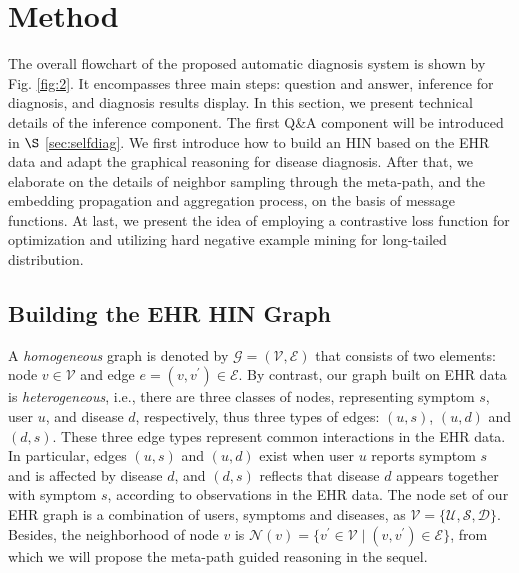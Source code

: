 \documentclass[sigconf]{acmart}
\newcommand{\bn}{\mathcal{N}}
\newcommand{\be}{\mathcal{E}}
\newcommand{\bv}{\mathcal{V}}
\begin{document}
\section{Method} \label{sec:3}
The overall flowchart of the proposed automatic diagnosis system is shown by Fig. \ref{fig:2}. It encompasses three main steps: question and answer, inference for diagnosis, and diagnosis results display. In this section, we present technical details of the inference component. The first Q\&A component will be introduced in $\S$ \ref{sec:selfdiag}. We first introduce how to build an HIN based on the EHR data and adapt the graphical reasoning for disease diagnosis. After that, we elaborate on the details of neighbor sampling through the meta-path, and the embedding propagation and aggregation process, on the basis of message functions. At last, we present the idea of employing a contrastive loss function for optimization and utilizing hard negative example mining for long-tailed distribution.

\subsection{Building the EHR HIN Graph}
A \emph{homogeneous} graph is denoted by $\mathcal{G}=(\mathcal{V},\mathcal{E})$ that consists of two elements: node $v \in \mathcal{V}$ and edge $e=(v,v^\prime) \in \mathcal{E}$. By contrast, our graph built on EHR data is \emph{heterogeneous}, i.e., there are three classes of nodes, representing symptom $s$, user $u$, and disease $d$, respectively, thus three types of edges: $(u,s)$, $(u,d)$ and $(d,s)$. These three edge types represent common interactions in the EHR data. In particular, edges $(u,s)$ and $(u,d)$ exist when user $u$ reports symptom $s$ and is affected by disease $d$, and $(d,s)$ reflects that disease $d$ appears together with symptom $s$, according to observations in the EHR data. The node set of our EHR graph is a combination of users, symptoms and diseases, as $\mathcal{V} = \{\mathcal{U},\mathcal{S},\mathcal{D}\}$. Besides, the neighborhood of node $v$ is $\bn(v)=\{v^\prime \in \bv \mid (v,v^\prime) \in \be \}$, from which we will propose the meta-path guided reasoning in the sequel.
\end{document}
